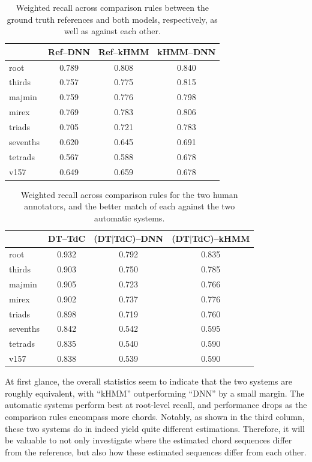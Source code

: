\documentclass{article}
\begin{document}
\begin{table}[!t]
\small
\centering
\begin{tabular}{l||ccc}
          & Ref--DNN & Ref--kHMM & kHMM--DNN \\
\hline
root      & 0.789      & 0.808       & 0.840       \\
thirds    & 0.757      & 0.775       & 0.815       \\
majmin    & 0.759      & 0.776       & 0.798       \\
mirex     & 0.769      & 0.783       & 0.806       \\
triads    & 0.705      & 0.721       & 0.783       \\
sevenths  & 0.620      & 0.645       & 0.691       \\
tetrads   & 0.567      & 0.588       & 0.678       \\
v157      & 0.649      & 0.659       & 0.678       \\
\hline
\end{tabular}
\caption{Weighted recall across comparison rules between the ground truth references and both models, respectively, as well as against each other.}
\label{tab:test_performance}
\end{table}

\begin{table}[!t]
\small
\centering
\begin{tabular}{l||ccc}
            & DT--TdC & (DT$|$TdC)--DNN & (DT$|$TdC)--kHMM \\
\hline
root        & 0.932 & 0.792 & 0.835 \\
thirds      & 0.903 & 0.750 & 0.785 \\
majmin      & 0.905 & 0.723 & 0.766 \\
mirex       & 0.902 & 0.737 & 0.776 \\
triads      & 0.898 & 0.719 & 0.760 \\
sevenths    & 0.842 & 0.542 & 0.595 \\
tetrads     & 0.835 & 0.540 & 0.590 \\
v157        & 0.838 & 0.539 & 0.590 \\
\hline
\end{tabular}
\caption{Weighted recall across comparison rules for the two human annotators, and the better match of each against the two automatic systems.}
\label{tab:rc_performance}
\end{table}

At first glance, the overall statistics seem to indicate that the two systems are roughly equivalent, with ``kHMM'' outperforming ``DNN'' by a small margin.
The automatic systems perform best at root-level recall, and performance drops as the comparison rules encompass more chords.
Notably, as shown in the third column, these two systems do in indeed yield quite different estimations.
Therefore, it will be valuable to not only investigate where the estimated chord sequences differ from the reference, but also how these estimated sequences differ from each other.
\end{document}
